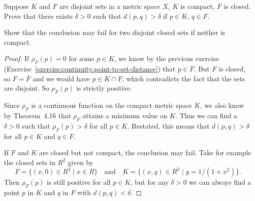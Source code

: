  Suppose $K$ and $F$ are disjoint sets in a metric space
$X$, $K$ is compact, $F$ is closed. Prove that there exists
$\delta > 0$ such that $d(p,q) > \delta$ if $p\in K$, $q\in F$.

Show that the conclusion may fail for two disjoint closed sets if
neither is compact.
\begin{proof}
  If $\rho_F(p) = 0$ for some $p\in K$, we know by the previous
  exercise (Exercise~\ref{exercise:continuity:point-to-set-distance})
  that $p\in\overline{F}$. But $F$ is closed, so $F = \overline{F}$
  and we would have $p\in K\cap F$, which contradicts the fact that
  the sets are disjoint. So $\rho_F(p)$ is strictly positive.

  Since $\rho_F$ is a continuous function on the compact metric space
  $K$, we also know by Theorem~4.16 that $\rho_F$ attains a minimum
  value on $K$. Thus we can find a $\delta > 0$ such that
  $\rho_F(p)>\delta$ for all $p\in K$. Restated, this means that
  $d(p,q) > \delta$ for all $p\in K$ and $q\in F$.

  If $F$ and $K$ are closed but not compact, the conclusion may
  fail. Take for example the closed sets in $R^2$ given by
  \begin{equation*}
    F = \{(x,0)\in R^2\mid x\in R\}
    \quad\text{and}\quad
    K = \{(x,y)\in R^2\mid y = 1/(1 + x^2)\}.
  \end{equation*}
  Then $\rho_F(p)$ is still positive for all $p\in K$, but for any
  $\delta > 0$ we can always find a point $p$ in $K$ and $q$ in $F$
  with $d(p,q) < \delta$.
\end{proof}

